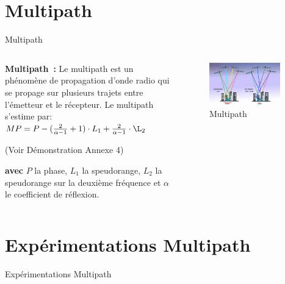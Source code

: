 \documentclass[xcolor=dvipsnames,envcountsect]{beamer}
\begin{document}
\section{Multipath}
\begin{frame}{Multipath}
	\begin{columns}
		\begin{column}{0.5\textwidth}
			\textbf{Multipath :} 
			Le multipath est un phénomène de propagation d'onde radio qui se propage sur plusieurs trajets entre l'émetteur et le récepteur.
			\newline
			Le multipath s'estime par: $MP = P - (\frac{2}{\alpha - 1} + 1) \cdot L_1 + \frac{2}{\alpha - 1} \cdot \L_2$
			\begin{flushright}
				\tiny{(Voir Démonstration Annexe 4)}
			\end{flushright}
			{\small \textbf{avec} $P$ la phase, $L_1$ la speudorange, $L_2$ la speudorange sur la deuxième fréquence et $\alpha$ le coefficient de réflexion.}
		\end{column}
		\begin{column}{0.5\textwidth}
			\begin{figure}
				\centering
				\includegraphics[width=0.9\textwidth]{./Figures/multipath2.png}
				\caption {Multipath \cite{esa}}	
			\end{figure}
		\end{column}	
	\end{columns}
\end{frame}

\section{Expérimentations Multipath}
\begin{frame}
	\centering
	\begin{block}
		\scshape
		\begin{center}
			\Huge Expérimentations Multipath
		\end{center}
	\end{block}
\end{frame}
\end{document}
